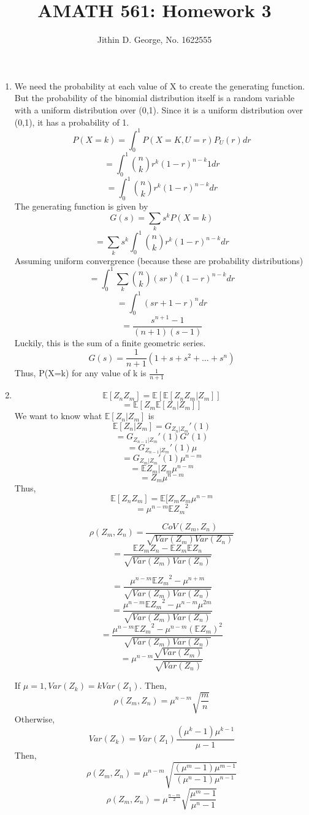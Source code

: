 \documentclass[a4paper,11pt]{article}
\title{AMATH 561: Homework 3}
\author{Jithin D. George, No. 1622555}
\begin{document}
\maketitle
\begin{enumerate}


	\item
	We need the probability at each value of X to create the generating function. 
But the probability of the binomial distribution itself is a random variable with a uniform distribution over (0,1). 
Since it is a uniform distribution over (0,1), it has a probability of 1. 	
\[P(X=k)=\int_{0}^{1} P(X=K,U=r)P_U(r)dr\]
\[=\int_{0}^{1} \binom{n}{k} r^k (1-r)^{n-k}1dr\]
\[=\int_{0}^{1} \binom{n}{k} r^k (1-r)^{n-k}dr\]
The generating function is given by
\[G(s)= \sum_k s^kP(X=k)\]
\[= \sum_k s^k\int_{0}^{1} \binom{n}{k} r^k (1-r)^{n-k}dr\]
Assuming uniform convergrence (because these are probability distributions)
\[= \int_{0}^{1} \sum_k  \binom{n}{k} (sr)^k (1-r)^{n-k}dr\]
\[= \int_{0}^{1} (sr+1-r)^{n}dr\]
\[= \frac{ s^{n+1} -1}{(n+1)(s-1)}\]
Luckily, this is the sum of a finite geometric series.
\[G(s) = \frac{1}{n+1}(1+s+s^2+\ldots +s^n)\]
Thus, P(X=k) for any value of k is $\frac{1}{n+1}$
\item
\[\mathbb{E}[Z_n Z_m]=\mathbb{E}[\mathbb{E}[Z_n Z_m|Z_m]]\]
\[=\mathbb{E}[Z_m\mathbb{E}[Z_n|Z_m]]\]
We want to know what $\mathbb{E}[Z_n|Z_m]$ is
\[\mathbb{E}[Z_n|Z_m]=G_{Z_n|Z_m}'(1)\]
\[=G_{Z_{n-1}|Z_m}'(1)G'(1)\]
\[=G_{Z_{n-1}|Z_m}'(1)\mu\]
\[=G_{Z_{m}|Z_m}'(1)\mu^{n-m}\]
\[=\mathbb{E}{Z_{m}|Z_m}\mu^{n-m}\]
\[=Z_{m}\mu^{n-m}\]
Thus,
\[\mathbb{E}[Z_n Z_m]=\mathbb{E}[Z_mZ_{m}\mu^{n-m}\]
\[= \mu^{n-m}\mathbb{E}{Z_m}^2\]

\[\rho(Z_m,Z_n)= \frac{CoV(Z_m,Z_n)}{\sqrt{Var(Z_m) Var(Z_n)}}\]
\[= \frac{\mathbb{E}{Z_mZ_n}-\mathbb{E}{Z_m}\mathbb{E}{Z_n}}{\sqrt{Var(Z_m) Var(Z_n)}}\]

\[= \frac{\mu^{n-m}\mathbb{E}{Z_m}^2-\mu^{n+m}}{\sqrt{Var(Z_m) Var(Z_n)}}\]
\[= \frac{\mu^{n-m}\mathbb{E}{Z_m}^2-\mu^{n-m}\mu^{2m}}{\sqrt{Var(Z_m) Var(Z_n)}}\]
\[= \frac{\mu^{n-m}\mathbb{E}{Z_m}^2-\mu^{n-m}(\mathbb{E}{Z_m})^2}{\sqrt{Var(Z_m) Var(Z_n)}}\]
\[= \mu^{n-m} \frac{\sqrt{Var(Z_m)}}{ \sqrt{Var(Z_n)}}\]

If $\mu = 1, Var(Z_k)=kVar(Z_1) $. Then,
\[\rho(Z_m,Z_n)=\mu^{n-m} \sqrt{\frac{m}{n}} \]
Otherwise, 
\[Var(Z_k)= Var(Z_1) \frac{(\mu^k-1)\mu^{k-1}}{\mu-1}\]
Then,
\[\rho(Z_m,Z_n)=\mu^{n-m} \sqrt{\frac{(\mu^m-1)\mu^{m-1}}{(\mu^n-1)\mu^{n-1}}} \]
\[\rho(Z_m,Z_n)=\mu^{\frac{n-m}{2}} \sqrt{\frac{\mu^m-1}{\mu^n-1}} \]


\end{enumerate}
\end{document}
